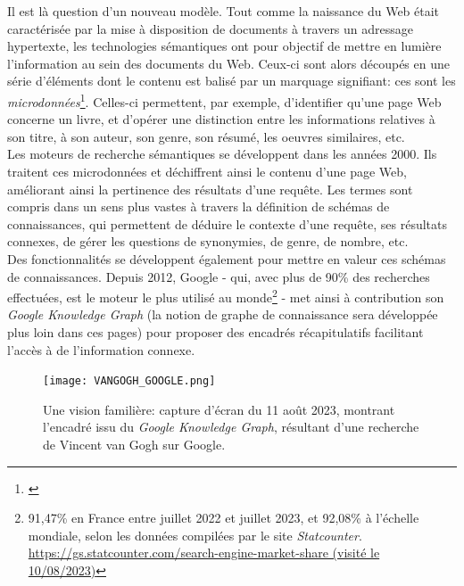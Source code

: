 \documentclass[a4paper,12pt,twoside]{book}
\begin{document}
Il est là question d'un nouveau modèle. Tout comme la naissance du Web était caractérisée par la mise à disposition de documents à travers un adressage hypertexte, les technologies sémantiques ont pour objectif de mettre en lumière l'information au sein des documents du Web. Ceux-ci sont alors découpés en une série d'éléments dont le contenu est balisé par un marquage signifiant: ces sont les \textit{microdonnées}\footnote{\cite[p.~82]{mesguichBibliothequesWebEst2017}}. Celles-ci permettent, par exemple, d'identifier qu'une page Web concerne un livre, et d'opérer une distinction entre les informations relatives à son titre, à son auteur, son genre, son résumé, les oeuvres similaires, etc.\\

Les moteurs de recherche sémantiques se développent dans les années 2000. Ils traitent ces microdonnées et déchiffrent ainsi le contenu d'une page Web, améliorant ainsi la pertinence des résultats d'une requête. Les termes sont compris dans un sens plus vastes à travers la définition de schémas de connaissances, qui permettent de déduire le contexte d'une requête, ses résultats connexes, de gérer les questions de synonymies, de genre, de nombre, etc.\\

Des fonctionnalités se développent également pour mettre en valeur ces schémas de connaissances. Depuis 2012, Google - qui, avec plus de  90\% des recherches effectuées, est le moteur le plus utilisé au monde\footnote{91,47\% en France entre juillet 2022 et juillet 2023, et 92,08\% à l'échelle mondiale, selon les données compilées par le site \textit{Statcounter}. \url{https://gs.statcounter.com/search-engine-market-share (visité le 10/08/2023)}} - met ainsi à contribution son \textit{Google Knowledge Graph} (la notion de graphe de connaissance sera développée plus loin dans ces pages) pour proposer des encadrés récapitulatifs facilitant l'accès à de l'information connexe. \\
\begin{figure}[h]
    \centering
    \texttt{[image: VANGOGH\_GOOGLE.png]}
    \caption{Une vision familière: capture d'écran du 11 août 2023, montrant l'encadré issu du \textit{Google Knowledge Graph}, résultant d'une recherche de \og Vincent van Gogh \fg{} sur Google.}
    \label{fig:GKG_Van_Gogh_11aout2023}
\end{figure}
\end{document}
